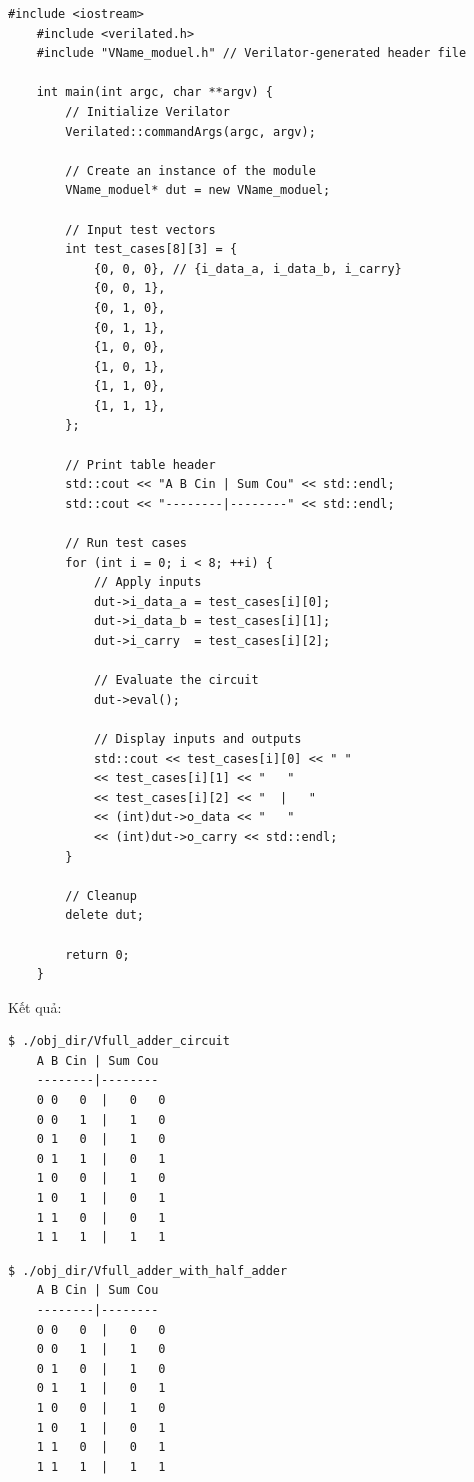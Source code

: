 \begin{lstlisting}[style=C, caption={Test bench của bộ Full Adder}]
	#include <iostream>
	#include <verilated.h>
	#include "VName_moduel.h" // Verilator-generated header file
	
	int main(int argc, char **argv) {
		// Initialize Verilator
		Verilated::commandArgs(argc, argv);
		
		// Create an instance of the module
		VName_moduel* dut = new VName_moduel;
		
		// Input test vectors
		int test_cases[8][3] = {
			{0, 0, 0}, // {i_data_a, i_data_b, i_carry}
			{0, 0, 1},
			{0, 1, 0},
			{0, 1, 1},
			{1, 0, 0},
			{1, 0, 1},
			{1, 1, 0},
			{1, 1, 1},
		};
		
		// Print table header
		std::cout << "A B Cin | Sum Cou" << std::endl;
		std::cout << "--------|--------" << std::endl;
		
		// Run test cases
		for (int i = 0; i < 8; ++i) {
			// Apply inputs
			dut->i_data_a = test_cases[i][0];
			dut->i_data_b = test_cases[i][1];
			dut->i_carry  = test_cases[i][2];
			
			// Evaluate the circuit
			dut->eval();
			
			// Display inputs and outputs
			std::cout << test_cases[i][0] << " "
			<< test_cases[i][1] << "   "
			<< test_cases[i][2] << "  |   "
			<< (int)dut->o_data << "   "
			<< (int)dut->o_carry << std::endl;
		}
		
		// Cleanup
		delete dut;
		
		return 0;
	}
\end{lstlisting}

Kết quả:

\begin{lstlisting}[style=C, caption={Kết quả của test bench của bộ Full Adder sử dụng cổng logic}]
	$ ./obj_dir/Vfull_adder_circuit 
	A B Cin | Sum Cou
	--------|--------
	0 0   0  |   0   0
	0 0   1  |   1   0
	0 1   0  |   1   0
	0 1   1  |   0   1
	1 0   0  |   1   0
	1 0   1  |   0   1
	1 1   0  |   0   1
	1 1   1  |   1   1
\end{lstlisting}


\begin{lstlisting}[style=C, caption={Kết quả của test bench của bộ Full Adder sử dụng bộ Half Adder}]
	$ ./obj_dir/Vfull_adder_with_half_adder 
	A B Cin | Sum Cou
	--------|--------
	0 0   0  |   0   0
	0 0   1  |   1   0
	0 1   0  |   1   0
	0 1   1  |   0   1
	1 0   0  |   1   0
	1 0   1  |   0   1
	1 1   0  |   0   1
	1 1   1  |   1   1
\end{lstlisting}